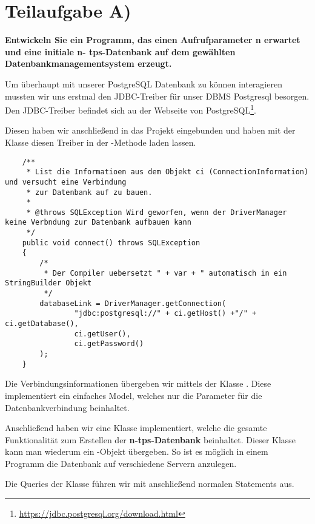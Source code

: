 \section{Teilaufgabe A)}
\textbf{Entwickeln Sie ein Programm, das einen Aufrufparameter n erwartet und eine initiale n-
tps-Datenbank auf dem gewählten Datenbankmanagementsystem erzeugt.}

Um überhaupt mit unserer PostgreSQL Datenbank zu können interagieren mussten wir
uns erstmal den JDBC-Treiber für unser DBMS Postgresql besorgen. Den
JDBC-Treiber befindet sich au der Webseite von
PostgreSQL\footnote{\url{https://jdbc.postgresql.org/download.html}}.

Diesen haben wir anschließend in das Projekt eingebunden und haben mit der
Klasse  diesen Treiber in der
-Methode laden lassen.

\begin{lstlisting}
	/**
	 * List die Informatioen aus dem Objekt ci (ConnectionInformation) und versucht eine Verbindung 
	 * zur Datenbank auf zu bauen.
	 * 
	 * @throws SQLException Wird geworfen, wenn der DriverManager keine Verbndung zur Datenbank aufbauen kann
	 */
	public void connect() throws SQLException
	{
		/*
		 * Der Compiler uebersetzt " + var + " automatisch in ein StringBuilder Objekt
		 */
		databaseLink = DriverManager.getConnection(
				"jdbc:postgresql://" + ci.getHost() +"/" + ci.getDatabase(),
				ci.getUser(), 
				ci.getPassword()
		);
	}
\end{lstlisting}

Die Verbindungsinformationen übergeben wir mittels der Klasse
. Diese implementiert ein einfaches Model, welches nur die
Parameter für die Datenbankverbindung beinhaltet.

Anschließend haben wir eine Klasse  implementiert, welche die
gesamte Funktionalität zum Erstellen der \textbf{n-tps-Datenbank} beinhaltet.
Dieser Klasse kann man wiederum ein -Objekt
übergeben. So ist es möglich in einem Programm die Datenbank auf
verschiedene Servern anzulegen. 

Die Queries der Klasse 
führen wir mit anschließend normalen Statements aus. 

